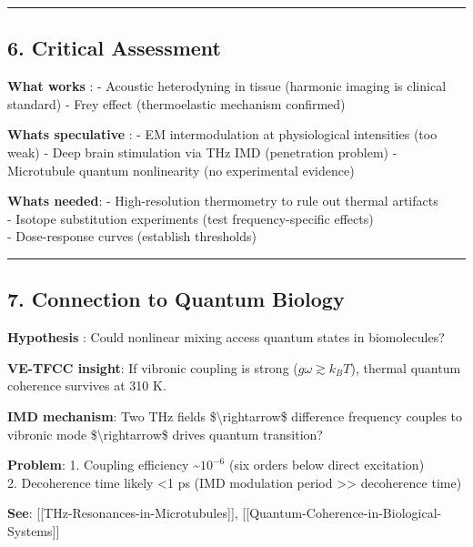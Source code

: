 \begin{center}\rule{0.5\linewidth}{0.5pt}\end{center}

\subsection{6. Critical Assessment}\label{critical-assessment}

\textbf{What works }: - Acoustic heterodyning in tissue (harmonic
imaging is clinical standard) - Frey effect (thermoelastic mechanism
confirmed)

\textbf{What\textquotesingle s speculative }: - EM intermodulation at
physiological intensities (too weak) - Deep brain stimulation via THz
IMD (penetration problem) - Microtubule quantum nonlinearity (no
experimental evidence)

\textbf{What\textquotesingle s needed}: - High-resolution thermometry to
rule out thermal artifacts\\
- Isotope substitution experiments (test frequency-specific effects)\\
- Dose-response curves (establish thresholds)

\begin{center}\rule{0.5\linewidth}{0.5pt}\end{center}

\subsection{7. Connection to Quantum
Biology}\label{connection-to-quantum-biology}

\textbf{Hypothesis} : Could nonlinear mixing access quantum states in
biomolecules?

\textbf{VE-TFCC insight}: If vibronic coupling is strong
(\(g\omega \gtrsim k_BT\)), thermal quantum coherence survives at 310 K.

\textbf{IMD mechanism}: Two THz fields \$\textbackslash rightarrow\$
difference frequency couples to vibronic mode
\$\textbackslash rightarrow\$ drives quantum transition?

\textbf{Problem}: 1. Coupling efficiency \textasciitilde{}\(10^{-6}\)
(six orders below direct excitation)\\
2. Decoherence time likely \textless1 ps (IMD modulation period
\textgreater\textgreater{} decoherence time)

\textbf{See}: {[}{[}THz-Resonances-in-Microtubules{]}{]},
{[}{[}Quantum-Coherence-in-Biological-Systems{]}{]}

